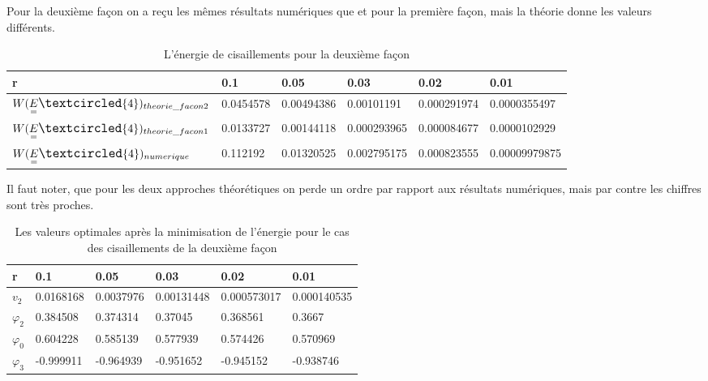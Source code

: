 \documentclass{article}
\newcommand\WE[1]{W(\underset{=}{E}\large{\textcircled{\small{#1}}})}
\begin{document}
Pour la deuxième façon on a reçu les mêmes résultats numériques que et pour la première façon, mais la théorie donne les valeurs différents.

\begin{table}[H]
    \begin{tabular}{|l|l|l|l|l|l|}
    \hline
     r &    0.1       &   0.05       &     0.03       &   0.02        &    0.01         \\ \hline
     $\WE{4}_{theorie\_facon2} $ &    0.0454578 &   0.00494386 &     0.00101191 &   0.000291974 &    0.0000355497 \\ \hline
     $\WE{4}_{theorie\_facon1} $                & 0.0133727 & 0.00144118 & 0.000293965 & 0.000084677 & 0.0000102929                                                                 \\ \hline
     $\WE{4}_{numerique}$ & 0.112192    & 0.01320525  & 0.002795175  & 0.000823555  & 0.00009979875 \\ \hline
    \end{tabular}
    \caption{L'énergie de cisaillements pour la deuxième façon}
\end{table}

Il faut noter, que pour les deux approches théorétiques on perde un ordre par rapport aux résultats numériques, mais par contre les chiffres sont très proches.

\begin{table}[H]
    \begin{tabular}{|l|l|l|l|l|l|}
    \hline
    r & 0.1     & 0.05    & 0.03       & 0.02        & 0.01      \\ \hline
    $v_2$ & 0.0168168 & 0.0037976 & 0.00131448 & 0.000573017 & 0.000140535 \\ \hline
    $\varphi_2$   & 0.384508  & 0.374314& 0.37045    & 0.368561    & 0.3667    \\ \hline
    $\varphi_0$ & 0.604228  & 0.585139& 0.577939   & 0.574426    & 0.570969  \\ \hline
    $\varphi_3$ & -0.999911 & -0.964939   & -0.951652  & -0.945152   & -0.938746 \\ \hline
    \end{tabular}
    \caption{Les valeurs optimales après la minimisation de l'énergie pour le cas des cisaillements de la deuxième façon}
\end{table}
\end{document}
